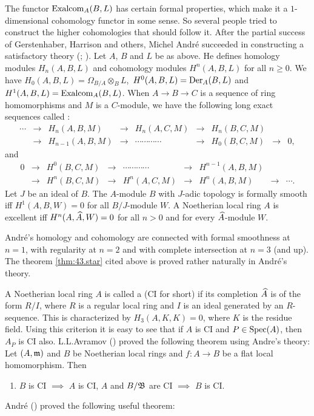 \documentclass[../main]{subfiles}
\begin{document}
The functor $\operatorname{Exalcom}_A(B, L)$ has certain formal properties, which make it a $1$-dimensional cohomology functor in some sense. So several people tried to construct the higher cohomologies that should follow it. After the partial success of Gerstenhaber, Harrison and others, Michel André succeeded in constructing a satisfactory theory (\cite{andre1967methode}; \cite{andré1974homologie}). Let $A$, $B$ and $L$ be as above. He defines homology modules $H_n(A, B, L)$ and cohomology modules $H^n(A, B, L)$ for all $n \geqslant 0$. We have $H_0(A, B, L)=\Omega_{B / A} \otimes_B L$, $\, H^0(A, B, L)=\operatorname{Der}_A(B, L)$ and $H^1(A, B, L)=\operatorname{Exalcom}_A(B, L)$. When $A\longrightarrow B\longrightarrow C$ is a sequence of ring homomorphisms and $M$ is a $C$-module, we have the following long exact sequences called :
\[\begin{aligned}
\cdots&\longrightarrow& H_n(A,B,M)&\longrightarrow& H_n(A,C,M)&\longrightarrow& H_n(B,C,M)&\\ &\longrightarrow& H_{n-1}(A,B,M)&\longrightarrow&\cdots\cdots\cdots\cdots&\longrightarrow& H_0(B,C,M)&\longrightarrow& 0,\end{aligned}\]
and
\[\begin{aligned}0&\longrightarrow& H^0(B,C,M)&\longrightarrow&\cdots\cdots\cdots\cdots&\longrightarrow& H^{n-1}(A,B,M) &\\ &\longrightarrow &H^n(B,C,M)&\longrightarrow &H^n(A,C,M)&\longrightarrow& H^n(A,B,M)&\longrightarrow&\cdots.\end{aligned}\]
Let $J$ be an ideal of $B$. The $A$-module $B$ with $J$-adic topology is formally smooth iff $H^1(A, B, W)=0$ for all $B / J$-module $W$. A Noetherian local ring $A$ is excellent iff $H^n(A, \widehat{A}, W)=0$ for all $n>0$ and for every $\widehat{A}$-module $W$.

André's homology and cohomology are connected with formal smoothness at $n=1$, with regularity at $n=2$ and with complete intersection at $n=3$ (and up). The theorem \ref{thm:43.star} cited above is proved rather naturally in André's theory.

A Noetherian local ring $A$ is called a  (CI for short) if its completion $\widehat{A}$ is of the form $R / I$, where $R$ is a regular local ring and $I$ is an ideal generated by an $R$-sequence. This is characterized by $H_3(A, K, K)=0$, where $K$ is the residue field. Using this criterion it is easy to see that if $A$ is CI and $P \in\operatorname{Spec}(A)$, then $A_P$ is CI also. L.L.Avramov (\cite{avramov1975flat}) proved the following theorem using Andre's theory: Let $(A, \mathfrak{m})$ and $B$ be Noetherian local rings and $f: A\longrightarrow B$ be a flat local homomorphism. Then
\begin{enumerate}[label=$(\dagger)$]
    \item\label{thm:43.dagger} $B$ is CI $\implies$ $A$ is CI, $A$ and $B/\mathfrak{B}$ are CI $\implies$ $B$ is CI.
\end{enumerate}
André (\cite{andre1974localisation}) proved the following useful theorem:
\end{document}
